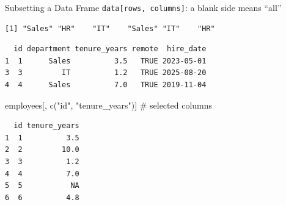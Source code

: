 \documentclass[
  ignorenonframetext,
  aspectratio=169,
]{beamer}
\newenvironment{Shaded}{\begin{snugshade}}{\end{snugshade}}
\newcommand{\CommentTok}[1]{\textcolor[rgb]{0.37,0.37,0.37}{#1}}
\newcommand{\FunctionTok}[1]{\textcolor[rgb]{0.28,0.35,0.67}{#1}}
\newcommand{\NormalTok}[1]{\textcolor[rgb]{0.00,0.23,0.31}{#1}}
\newcommand{\SpecialCharTok}[1]{\textcolor[rgb]{0.37,0.37,0.37}{#1}}
\newcommand{\StringTok}[1]{\textcolor[rgb]{0.13,0.47,0.30}{#1}}
\begin{document}
\begin{frame}[fragile]{Subsetting a Data Frame}
\protect\hypertarget{subsetting-a-data-frame}{}
\texttt{data{[}rows,\ columns{]}}: a blank side means ``all''

\begin{Shaded}
\end{Shaded}

\begingroup\tiny\color{darkgray}

\begin{verbatim}
[1] "Sales" "HR"    "IT"    "Sales" "IT"    "HR"   
\end{verbatim}

\endgroup

\begin{Shaded}
\end{Shaded}

\begingroup\tiny\color{darkgray}

\begin{verbatim}
  id department tenure_years remote  hire_date
1  1      Sales          3.5   TRUE 2023-05-01
3  3         IT          1.2   TRUE 2025-08-20
4  4      Sales          7.0   TRUE 2019-11-04
\end{verbatim}

\endgroup

\begin{Shaded}
\begin{Highlighting}[]
\NormalTok{employees[, }\FunctionTok{c}\NormalTok{(}\StringTok{"id"}\NormalTok{, }\StringTok{"tenure\_years"}\NormalTok{)]    }\CommentTok{\# selected columns}
\end{Highlighting}
\end{Shaded}

\begingroup\tiny\color{darkgray}

\begin{verbatim}
  id tenure_years
1  1          3.5
2  2         10.0
3  3          1.2
4  4          7.0
5  5           NA
6  6          4.8
\end{verbatim}

\endgroup
\end{frame}
\end{document}
